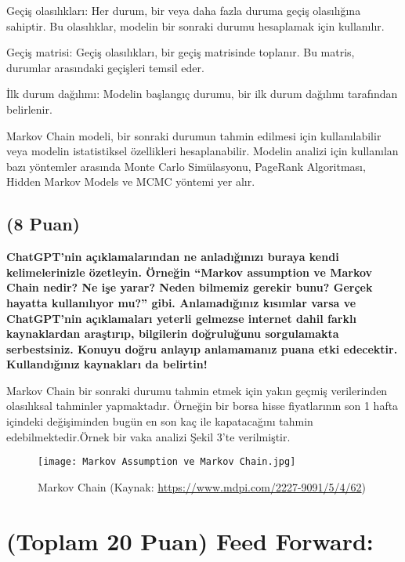 \documentclass[11pt]{article}
\begin{document}
Geçiş olasılıkları: Her durum, bir veya daha fazla duruma geçiş olasılığına sahiptir. Bu olasılıklar, modelin bir sonraki durumu hesaplamak için kullanılır.

Geçiş matrisi: Geçiş olasılıkları, bir geçiş matrisinde toplanır. Bu matris, durumlar arasındaki geçişleri temsil eder.

İlk durum dağılımı: Modelin başlangıç durumu, bir ilk durum dağılımı tarafından belirlenir.

Markov Chain modeli, bir sonraki durumun tahmin edilmesi için kullanılabilir veya modelin istatistiksel özellikleri hesaplanabilir. Modelin analizi için kullanılan bazı yöntemler arasında Monte Carlo Simülasyonu, PageRank Algoritması, Hidden Markov Models ve MCMC yöntemi yer alır.

\subsection{(8 Puan)} \textbf{ChatGPT’nin açıklamalarından ne anladığınızı buraya kendi kelimelerinizle özetleyin. Örneğin ``Markov assumption ve Markov Chain nedir? Ne işe yarar? Neden bilmemiz gerekir bunu? Gerçek hayatta kullanılıyor mu?'' gibi. Anlamadığınız kısımlar varsa ve ChatGPT’nin açıklamaları yeterli gelmezse internet dahil farklı kaynaklardan araştırıp, bilgilerin doğruluğunu sorgulamakta serbestsiniz. Konuyu doğru anlayıp anlamamanız puana etki edecektir. Kullandığınız kaynakları da belirtin!}

Markov Chain bir sonraki durumu tahmin etmek için yakın geçmiş verilerinden olasılıksal tahminler yapmaktadır. Örneğin bir borsa hisse fiyatlarının son 1 hafta içindeki değişiminden bugün en son kaç ile kapatacağını tahmin edebilmektedir.Örnek bir vaka analizi Şekil 3'te verilmiştir.

\begin{figure}[ht]
  \centering
  \shorthandoff{=}
  \texttt{[image: Markov Assumption ve Markov Chain.jpg]}
  \shorthandoff{=}
  \caption[Şekil 1]{Markov Chain (Kaynak: \url{https://www.mdpi.com/2227-9091/5/4/62})}
  \label{fig:Şekil 1}
\end{figure}
\newpage
\section{(Toplam 20 Puan) Feed Forward:}
 
\end{document}
